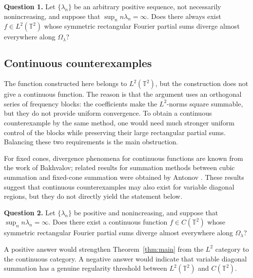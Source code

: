 \documentclass[11pt]{amsart}
\numberwithin{equation}{section}
\begin{document}
\medskip \noindent\textbf{Question 1.} Let $\{\lambda_n\}$ be an arbitrary
positive sequence, not necessarily nonincreasing, and suppose that $\sup_n
n\lambda_n=\infty$. Does there always exist $f\in L^2(\mathbb{T}^2)$ whose
symmetric rectangular Fourier partial sums diverge almost everywhere along $%
\Omega_\lambda$?

\subsection*{Continuous counterexamples}

The function constructed here belongs to $L^2(\mathbb{T}^2)$, but the
construction does not give a continuous function. The reason is that the
argument uses an orthogonal series of frequency blocks: the coefficients
make the $L^2$-norms square summable, but they do not provide uniform
convergence. To obtain a continuous counterexample by the same method, one
would need much stronger uniform control of the blocks while preserving
their large rectangular partial sums. Balancing these two requirements is
the main obstruction.

For fixed cones, divergence phenomena for continuous functions are known
from the work of Bakhvalov; related results for summation methods between
cubic summation and fixed-cone summation were obtained by Antonov \cite%
{Antonov2014,Bakhvalov1997,Bakhvalov2002}. These results suggest that
continuous counterexamples may also exist for variable diagonal regions, but
they do not directly yield the statement below.

\medskip \noindent\textbf{Question 2.} Let $\{\lambda_n\}$ be positive and
nonincreasing, and suppose that $\sup_n n\lambda_n=\infty$. Does there exist
a continuous function $f\in C(\mathbb{T}^2)$ whose symmetric rectangular
Fourier partial sums diverge almost everywhere along $\Omega_\lambda$?

A positive answer would strengthen Theorem~\ref{thm:main} from the $L^2$
category to the continuous category. A negative answer would indicate that
variable diagonal summation has a genuine regularity threshold between $L^2(%
\mathbb{T}^2)$ and $C(\mathbb{T}^2)$.
\end{document}
